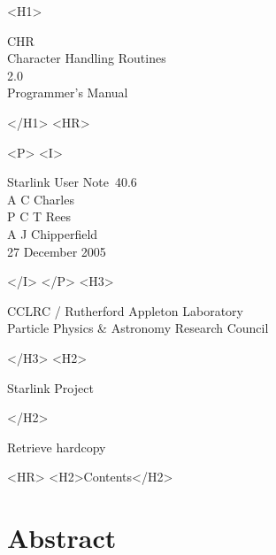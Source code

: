 \documentclass[twoside,11pt]{article}
\newcommand{\stardoccategory}  {Starlink User Note}
\newcommand{\stardocsource}    {sun\stardocnumber}
\newcommand{\stardocnumber}    {40.6}
\newcommand{\stardocauthors}   {A C Charles\\P C T Rees\\A J Chipperfield }
\newcommand{\stardocdate}      {27 December 2005}
\newcommand{\stardoctitle}     {CHR \\ [\latex{1ex}]
                                Character Handling Routines}
\newcommand{\stardocversion}   {2.0}
\newcommand{\stardocmanual}    {Programmer's Manual}
\newcommand{\htmladdnormallink}[2]{#1}
\newcommand{\htmladdimg}[1]{}
\newcommand{\htmlref}[2]{#1}
\newcommand{\htmladdtonavigation}[1]{}
\newcommand{\latex}[1]{#1}
\newcommand{\xlabel}[1]{}
\renewcommand{\_}{\texttt{\symbol{95}}}
\begin{document}
\begin{htmlonly}
   \xlabel{}
   \begin{rawhtml} <H1> \end{rawhtml}
      \stardoctitle\\
      \stardocversion\\
      \stardocmanual
   \begin{rawhtml} </H1> <HR> \end{rawhtml}


   \begin{rawhtml} <P> <I> \end{rawhtml}
   \stardoccategory\ \stardocnumber \\
   \stardocauthors \\
   \stardocdate
   \begin{rawhtml} </I> </P> <H3> \end{rawhtml}
      \htmladdnormallink{CCLRC / Rutherford Appleton Laboratory}
                        {http://www.cclrc.ac.uk} \\
      \htmladdnormallink{Particle Physics \& Astronomy Research Council}
                        {http://www.pparc.ac.uk} \\
   \begin{rawhtml} </H3> <H2> \end{rawhtml}
      \htmladdnormallink{Starlink Project}{http://www.starlink.rl.ac.uk/}
   \begin{rawhtml} </H2> \end{rawhtml}
   \htmladdnormallink{\htmladdimg{source.gif} Retrieve hardcopy}
      {http://www.starlink.rl.ac.uk/cgi-bin/hcserver?\stardocsource}\\

  \label{stardoccontents}
  \begin{rawhtml} 
    <HR>
    <H2>Contents</H2>
  \end{rawhtml}
  \htmladdtonavigation{\htmlref{\htmladdimg{contents_motif.gif}}
        {stardoccontents}}

  \section{\xlabel{abstract}Abstract}
\end{htmlonly}
\end{document}
